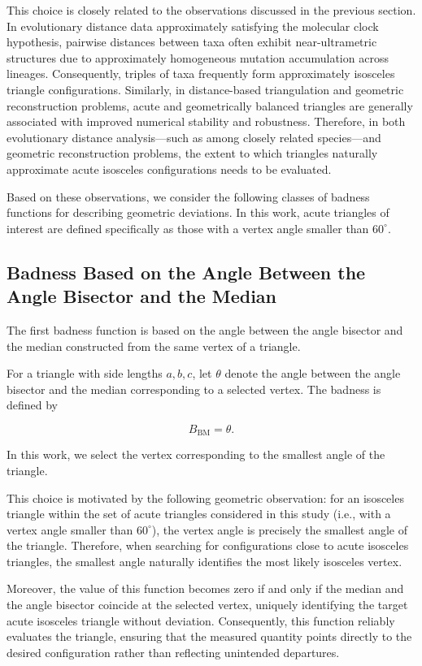 \documentclass[11pt]{article}
\begin{document}
This choice is closely related to the observations discussed in the previous section. In evolutionary distance data approximately satisfying the molecular clock hypothesis, pairwise distances between taxa often exhibit near-ultrametric structures due to approximately homogeneous mutation accumulation across lineages. Consequently, triples of taxa frequently form approximately isosceles triangle configurations. Similarly, in distance-based triangulation and geometric reconstruction problems, acute and geometrically balanced triangles are generally associated with improved numerical stability and robustness. Therefore, in both evolutionary distance analysis—such as among closely related species—and geometric reconstruction problems, the extent to which triangles naturally approximate acute isosceles configurations needs to be evaluated.

Based on these observations, we consider the following classes of badness functions for describing geometric deviations. In this work, acute triangles of interest are defined specifically as those with a vertex angle smaller than $60^\circ$.

\subsection{Badness Based on the Angle Between the Angle Bisector and the Median}

The first badness function is based on the angle between the angle bisector and the median constructed from the same vertex of a triangle.

For a triangle with side lengths \(a,b,c\), let \(\theta\) denote the angle between the angle bisector and the median corresponding to a selected vertex. The badness is defined by

\[
B_{\mathrm{BM}}=\theta .
\]

In this work, we select the vertex corresponding to the smallest angle of the triangle.

This choice is motivated by the following geometric observation: for an isosceles triangle within the set of acute triangles considered in this study (i.e., with a vertex angle smaller than $60^\circ$), the vertex angle is precisely the smallest angle of the triangle. Therefore, when searching for configurations close to acute isosceles triangles, the smallest angle naturally identifies the most likely isosceles vertex.

Moreover, the value of this function becomes zero if and only if the median and the angle bisector coincide at the selected vertex, uniquely identifying the target acute isosceles triangle without deviation. Consequently, this function reliably evaluates the triangle, ensuring that the measured quantity points directly to the desired configuration rather than reflecting unintended departures.
\end{document}
